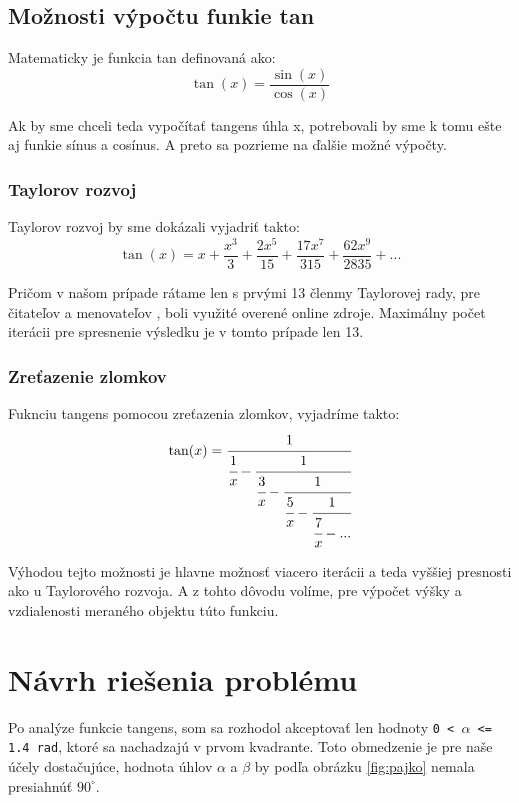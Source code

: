 \documentclass[12pt,a4paper,titlepage,final]{report}
\begin{document}
\section{Možnosti výpočtu funkie tan}
Matematicky je funkcia tan definovaná ako:
\begin{equation} \label{eq:taylor}
\tan(x) = \frac{\sin(x)}{\cos(x)}
\end{equation}

Ak by sme chceli teda vypočítať tangens úhla x, potrebovali by sme k tomu ešte aj funkie sínus a cosínus. A preto sa pozrieme na ďalšie možné výpočty.

\subsection{Taylorov rozvoj}
Taylorov rozvoj by sme dokázali vyjadriť takto:
\begin{equation} \label{eq:taylor}
\tan(x) = x + \frac{x^3}{3} + \frac{2x^5}{15} + \frac{17x^7}{315} + \frac{62x^9}{2835} + ...
\end{equation}

Pričom v našom prípade rátame len s prvými 13 členmy Taylorovej rady, pre čitateľov \cite{numerators} a menovateľov \cite{denominators}, boli využité overené online zdroje. Maximálny počet iterácii pre spresnenie výsledku je v tomto prípade len 13.

\subsection{Zreťazenie zlomkov} \label{subsec:zlomky}
Fuknciu tangens pomocou zreťazenia zlomkov, vyjadríme takto:
\begin{equation} \label{eq:cfrac}
\tan(x) = \cfrac{1}{ \cfrac{1}{x} - \cfrac{1}{\cfrac{3}{x} - \cfrac{1}{\cfrac{5}{x} - \cfrac{1}{\cfrac{7}{x} - ... }} }}
\end{equation}

Výhodou tejto možnosti je hlavne možnosť viacero iterácii a teda vyššiej presnosti ako u Taylorového rozvoja. A z tohto dôvodu volíme, pre výpočet výšky a vzdialenosti meraného objektu túto funkciu.

\chapter{Návrh riešenia problému}
Po analýze funkcie tangens, som sa rozhodol akceptovať len hodnoty \texttt{0 < $\alpha$ <= 1.4 rad}, ktoré sa nachadzajú v prvom kvadrante. Toto obmedzenie je pre naše účely dostačujúce, hodnota úhlov $\alpha$ a $\beta$ by podľa obrázku \ref{fig:pajko} nemala presiahnúť $90^\circ$.
\end{document}
